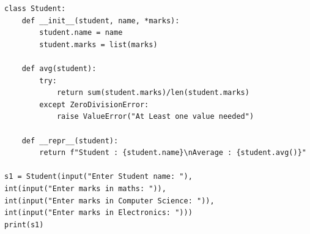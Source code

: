 \begin{verbatim}
class Student:
	def __init__(student, name, *marks):
		student.name = name
		student.marks = list(marks)
	
	def avg(student):
		try:
			return sum(student.marks)/len(student.marks)
		except ZeroDivisionError:
			raise ValueError("At Least one value needed")
	
	def __repr__(student):
		return f"Student : {student.name}\nAverage : {student.avg()}"

s1 = Student(input("Enter Student name: "), 
int(input("Enter marks in maths: ")), 
int(input("Enter marks in Computer Science: ")), 
int(input("Enter marks in Electronics: ")))
print(s1)
\end{verbatim}